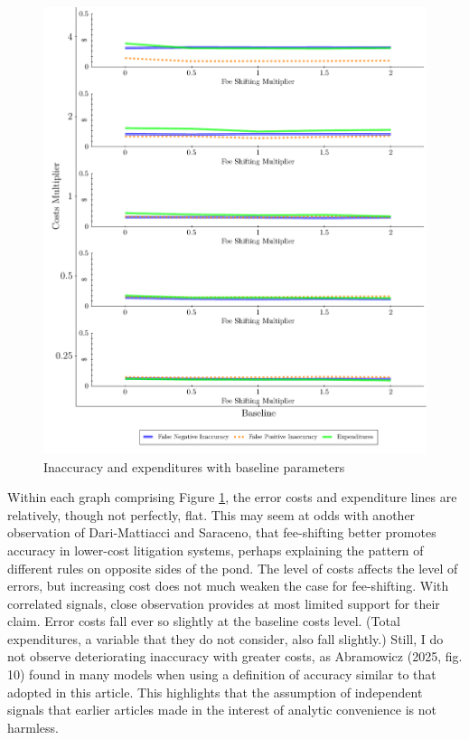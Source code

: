 \documentclass{article}
\begin{document}
\begin{figure}[h!]
\centering
\includegraphics[scale=0.50, trim={0in 0in 0in 0in}, clip]{../Figures/Accuracy and Expenditures Baseline.pdf}
\caption{Inaccuracy and expenditures with baseline parameters}
\label{fig:accexp_baseline}
\end{figure}

Within each graph comprising Figure \ref{fig:accexp_baseline}, the error costs and expenditure lines are relatively, though not perfectly, flat. This may seem at odds with another observation of Dari-Mattiacci and Saraceno, that fee-shifting better promotes accuracy in lower-cost litigation systems, perhaps explaining the pattern of different rules on opposite sides of the pond. The level of costs affects the level of errors, but increasing cost does not much weaken the case for fee-shifting. With correlated signals, close observation provides at most limited support for their claim. Error costs fall ever so slightly at the baseline costs level. (Total expenditures, a variable that they do not consider, also fall slightly.) Still, I do not observe deteriorating inaccuracy with greater costs, as Abramowicz (2025, fig. 10) found in many models when using a definition of accuracy similar to that adopted in this article. This highlights that the assumption of independent signals that earlier articles made in the interest of analytic convenience is not harmless.
\end{document}
